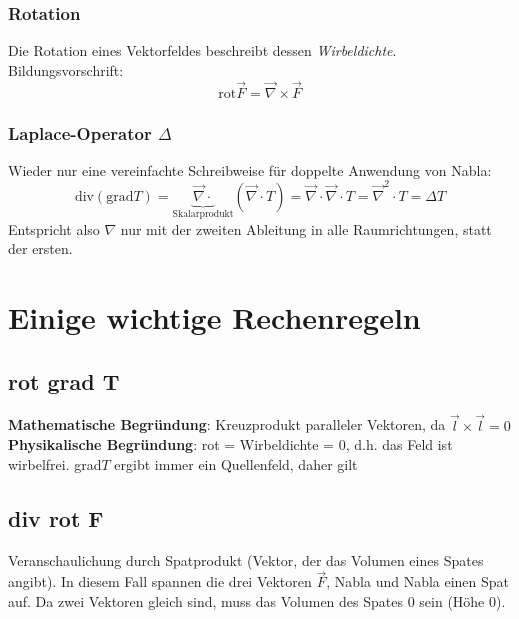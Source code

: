 \documentclass[11pt, a4paper]{article}
\begin{document}
\subsubsection{Rotation}

\begin{figure}[H]
\centering
{}
\end{figure}

Die Rotation eines Vektorfeldes beschreibt dessen \emph{Wirbeldichte}. Bildungsvorschrift:
\[\text{rot} \vec{F} = \vec{\nabla} \times \vec{F}\]

\subsubsection{Laplace-Operator $\Delta$}
Wieder nur eine vereinfachte Schreibweise für doppelte Anwendung von Nabla:
\[\text{div}(\text{grad}T)=\underbrace{\vec{\nabla} \cdot}_{\text{Skalarprodukt}} (\vec{\nabla} \cdot T)=\vec{\nabla} \cdot \vec{\nabla} \cdot T = \vec{\nabla}^{2} \cdot T = \Delta T\]
Entspricht also $\nabla$ nur mit der zweiten Ableitung in alle Raumrichtungen, statt der ersten.

\section{Einige wichtige Rechenregeln}
\subsection{rot grad T}

\textbf{Mathematische Begründung}: Kreuzprodukt paralleler Vektoren,
da $\vec{l} \times \vec{l} = 0$\\

\textbf{Physikalische Begründung}: rot = Wirbeldichte = 0, d.h. das Feld ist wirbelfrei. grad$T$ ergibt immer ein Quellenfeld, daher gilt

\subsection{div rot F}

Veranschaulichung durch Spatprodukt (Vektor, der das Volumen eines Spates angibt). In diesem Fall spannen die drei Vektoren $\vec{F}$, Nabla und Nabla einen Spat auf. Da zwei Vektoren gleich sind, muss das Volumen des Spates 0 sein (Höhe 0).
\end{document}
